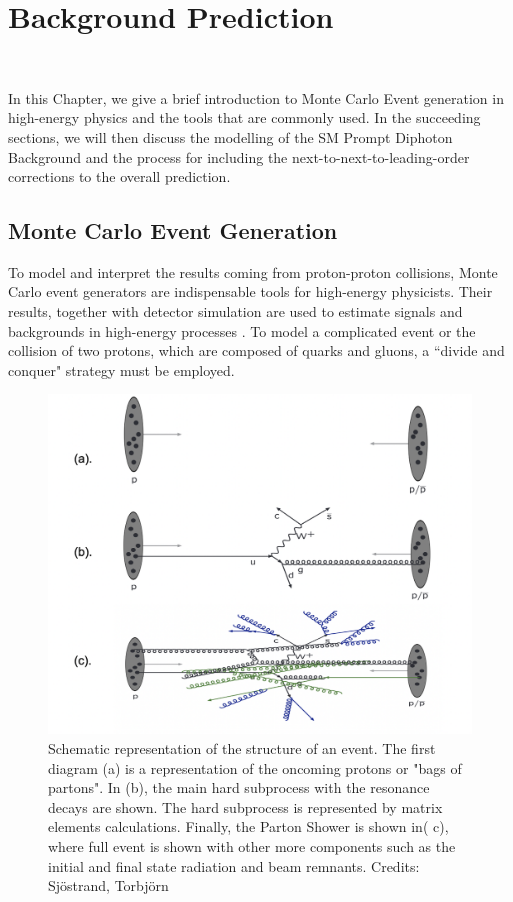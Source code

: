 \chapter{\textnormal{Background Prediction}}~\label{ch:background}


In this Chapter, we give a brief introduction to Monte Carlo Event generation in high-energy physics and the tools that are commonly used. In the succeeding sections, we will then discuss the modelling of the SM Prompt Diphoton Background and the process for including the next-to-next-to-leading-order corrections to the overall prediction. 

\section{Monte Carlo Event Generation}

To model and interpret the results coming from proton-proton collisions, Monte Carlo event generators are indispensable tools for high-energy physicists. Their results, together with detector simulation are used to estimate signals and backgrounds in high-energy processes \cite{Tanabashi:2018oca}. To model a complicated event or the collision of two protons, which are composed of quarks and gluons, a ``divide and conquer" strategy must be employed.  

\begin{figure}[!htb]
	\centering
	\includegraphics[scale=0.5]{fig/eventStructure.png}
	\caption{Schematic representation of the structure of an event. The first diagram (a) is a representation of the oncoming protons or "bags of partons". In (b), the main hard subprocess with the resonance decays are shown. The hard subprocess is represented by matrix elements calculations. Finally, the Parton Shower is shown in( c), where full event is shown with other more components such as the initial and final state radiation and beam remnants. Credits: Sj{\"o}strand, Torbj{\"o}rn}
	\label{fig:EventStructure}
\end{figure}


